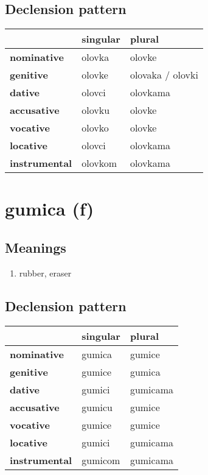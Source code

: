 \subsection*{Declension pattern}
\begin{tabularx}{\linewidth}{Xll}
\toprule
{} & singular &            plural \\
\midrule
\textbf{nominative  } &   olovka &            olovke \\
\textbf{genitive    } &   olovke &  olovaka / olovki \\
\textbf{dative      } &   olovci &          olovkama \\
\textbf{accusative  } &   olovku &            olovke \\
\textbf{vocative    } &   olovko &            olovke \\
\textbf{locative    } &   olovci &          olovkama \\
\textbf{instrumental} &  olovkom &          olovkama \\
\bottomrule
\end{tabularx}

\filbreak
\section{gumica (f)}
\subsection*{Meanings}
\begin{enumerate}
\item rubber, eraser
\end{enumerate}
\subsection*{Declension pattern}
\begin{tabularx}{\linewidth}{Xll}
\toprule
{} & singular &    plural \\
\midrule
\textbf{nominative  } &   gumica &    gumice \\
\textbf{genitive    } &   gumice &    gumica \\
\textbf{dative      } &   gumici &  gumicama \\
\textbf{accusative  } &   gumicu &    gumice \\
\textbf{vocative    } &   gumice &    gumice \\
\textbf{locative    } &   gumici &  gumicama \\
\textbf{instrumental} &  gumicom &  gumicama \\
\bottomrule
\end{tabularx}

